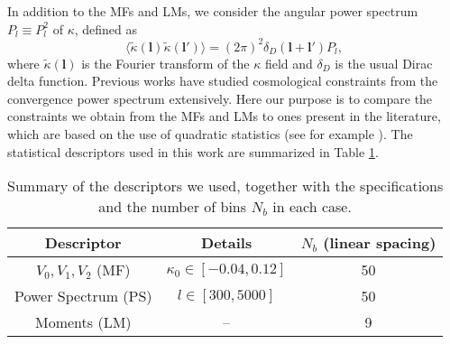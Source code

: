 \documentclass[reprint,aps,prd,superscriptaddress,showkeys,showpacs]{revtex4-1}
\begin{document}
In addition to the MFs and LMs, we consider the angular power spectrum
$P_l\equiv P^2_l$ of $\kappa$, defined as
\begin{equation}
\label{powerspectrum}
\langle\tilde{\kappa}(\mathbf{l})\tilde{\kappa}(\mathbf{l}')\rangle=(2\pi)^2\delta_D(\mathbf{l}+\mathbf{l}')P_l,
\end{equation}  
%
where $\tilde{\kappa}(\mathbf{l})$ is the Fourier transform of the
$\kappa$ field and $\delta_D$ is the usual Dirac delta
function. Previous works have studied cosmological constraints from
the convergence power spectrum extensively.  Here our purpose is to
compare the constraints we obtain from the MFs and LMs to ones present
in the literature, which are based on the use of quadratic statistics
(see for example \citep{CFHTKilbinger}). The statistical descriptors
used in this work are summarized in Table \ref{desctable}.
%
\begin{table}
\begin{tabular}{c|c|c} \hline
Descriptor & Details & $N_b$ (linear spacing) \\ \hline
$V_0,V_1,V_2$ (MF) & $\kappa_0\in[-0.04,0.12]$ & 50 \\
Power Spectrum (PS) & $l \in [300,5000]$ & 50 \\
Moments (LM) & -- & 9 \\
\end{tabular}
\caption{Summary of the descriptors we used, together with the specifications and the number of bins $N_b$ in each case.}
\label{desctable}
\end{table}
%
\end{document}

